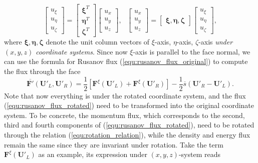 \documentclass{report}
\begin{document}
\begin{appendices}
\begin{equation}
\begin{bmatrix}
    u_\xi \\
    u_\eta \\
    u_\zeta
    \end{bmatrix}
    =
    \begin{bmatrix}
    \bm{\xi}^T \\
    \bm{\eta}^T \\
    \bm{\zeta}^T 
    \end{bmatrix}
    \begin{bmatrix}
    u_x \\
    u_y \\
    u_z
    \end{bmatrix}, \ \ \ 
    \begin{bmatrix}
    u_x \\
    u_y \\
    u_z
    \end{bmatrix}
    =
    \begin{bmatrix}
    \bm{\xi},\bm{\eta},\bm{\zeta} 
    \end{bmatrix}
    \begin{bmatrix}
    u_\xi \\
    u_\eta \\
    u_\zeta
    \end{bmatrix},
\end{equation}
where $\bm{\xi}, \bm{\eta}, \bm{\zeta}$ denote the unit column vectors of $\xi$-axis, $\eta$-axis, $\zeta$-axis \emph{under $(x,y,z)$ coordinate systems}.
Since now $\xi$-axis is parallel to the face normal, we can use the formula for Rusanov flux (\ref{equ:rusanov_flux_original}) to compute the flux through the face
\begin{equation} \label{equ:rusanov_flux_rotated}
    \overline{\mathbf{F'}}(\mathbf{U}'_L, \mathbf{U}'_R) = \frac{1}{2}\left[\mathbf{F}^\xi(\mathbf{U}'_L) + \mathbf{F}^\xi(\mathbf{U}'_R)\right] - \frac{1}{2}\overline{s}\left(\mathbf{U}'_R - \mathbf{U}'_L\right).
\end{equation}
Note that now everything is under the rotated coordinate system, and the flux (\ref{equ:rusanov_flux_rotated}) need to be transformed into the original coordinate system. To be concrete, the momentum flux, which corresponds to the second, third and fourth components of (\ref{equ:rusanov_flux_rotated}), need to be rotated through the relation (\ref{equ:rotation_relation}), while the density and energy flux remain the same since they are invariant under rotation. Take the term $\mathbf{F}^\xi(\mathbf{U}'_L)$ as an example, its expression under $(x,y,z)$-system reads

\end{appendices}
\end{document}
